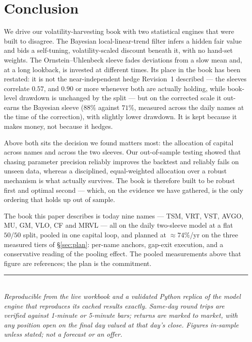 \documentclass[11pt]{article}
\begin{document}
\section{Conclusion}

We drive our volatility-harvesting book with two statistical engines that were built to disagree.
The Bayesian local-linear-trend filter infers a hidden fair value and bids a self-tuning,
volatility-scaled discount beneath it, with no hand-set weights. The Ornstein--Uhlenbeck sleeve
fades deviations from a slow mean and, at a long lookback, is invested at different times. Its
place in the book has been restated: it is not the near-independent hedge Revision~1 described ---
the sleeves correlate $0.57$, and $0.90$ or more whenever both are actually holding, while
book-level drawdown is unchanged by the split --- but on the corrected scale it out-earns the
Bayesian sleeve ($88\%$ against $71\%$, measured across the daily names at the time of the
correction), with slightly lower drawdown. It is kept because it makes money, not because it
hedges.

Above both sits the decision we found matters most: the allocation of capital across names and
across the two sleeves. Our out-of-sample testing showed that chasing parameter precision
reliably improves the backtest and reliably fails on unseen data, whereas a disciplined,
equal-weighted allocation over a robust mechanism is what actually survives. The book is
therefore built to be robust first and optimal second --- which, on the evidence we have
gathered, is the only ordering that holds up out of sample.

The book this paper describes is today nine names --- TSM, VRT, VST, AVGO, MU, GM, VLO, CF and
MRVL --- all on the daily two-sleeve model at a flat $50/50$ split, pooled in one capital loop,
and planned at $\approx74\%$/yr on the three measured tiers of \S\ref{sec:plan}: per-name anchors,
gap-exit execution, and a conservative reading of the pooling effect. The pooled measurements
above that figure are references; the plan is the commitment.

\vfill
{\color{bcrule}\rule{\textwidth}{0.5pt}}\\[0.2em]
{\footnotesize\itshape\color{bcgrey} Reproducible from the live workbook and a validated Python
replica of the model engine that reproduces its cached results exactly. Same-day round trips are
verified against 1-minute or 5-minute bars; returns are marked to market, with any position open
on the final day valued at that day's close. Figures in-sample unless stated; not a forecast or
an offer.}
\end{document}
